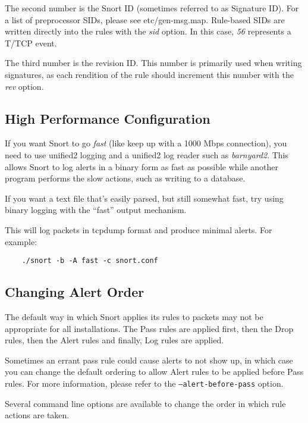 \documentclass[english]{report}
\newenvironment{note}{
\samepage
    \vspace{10pt}{\textsf{
        {\hspace{7pt}\Huge{$\triangle$\hspace{-12.5pt}{\Large{$^!$}}}}\hspace{5pt}
        {\Large{NOTE}}
    }
    }
   \begin{center}
    \par\vspace{-17pt}

    \begin{lrbox}{\savepar}
    \begin{minipage}[r]{6in}
}
{
    \end{minipage}
    \end{lrbox}
    \fbox{
        \usebox{
            \savepar
	}
    }
    \par\vskip10pt
    \end{center}
}
\newenvironment{note}{
        \begin{rawhtml}
        <p><table border="1"><tr><td><b>
        Note:&nbsp;&nbsp;</b>
        \end{rawhtml}
}{
        \begin{rawhtml}
        </b></td></tr></table></p>
        \end{rawhtml}
}
\begin{document}
The second number is the Snort ID (sometimes referred to as Signature ID).
For a list of preprocessor SIDs, please see etc/gen-msg.map.  Rule-based SIDs
are written directly into the rules with the \emph{sid} option. In this case,
\emph{56} represents a T/TCP event.
  	 
The third number is the revision ID. This number is primarily used when
writing signatures, as each rendition of the rule should increment this number
with the \emph{rev} option.

\subsection{High Performance Configuration}

If you want Snort to go \emph{fast} (like keep up with a 1000 Mbps connection),
you need to use unified2 logging and a unified2 log reader such as
\emph{barnyard2}.  This allows Snort to log alerts in a binary form as fast as
possible while another program performs the slow actions, such as writing to a
database.

If you want a text file that's easily parsed, but still somewhat fast, try
using binary logging with the ``fast'' output mechanism. 

This will log packets in tcpdump format and produce minimal alerts. For
example:

\begin{verbatim}
    ./snort -b -A fast -c snort.conf
\end{verbatim}

\subsection{Changing Alert Order}

The default way in which Snort applies its rules to packets may not be
appropriate for all installations.  The Pass rules are applied first, then the
Drop rules, then the Alert rules and finally, Log rules are applied. 

\begin{note}
Sometimes an errant pass rule could cause alerts to not show up, in
which case you can change the default ordering to allow Alert rules
to be applied before Pass rules.  For more information, please refer
to the \texttt{--alert-before-pass} option.
\end{note}

Several command line options are available to change the order in
which rule actions are taken.
\end{document}
